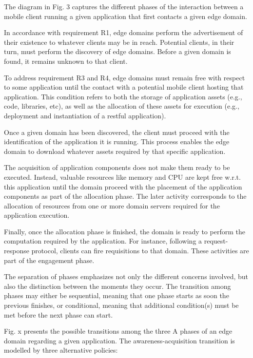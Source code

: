 The diagram in Fig. 3 captures the different phases of the interaction between a mobile client running a given application that first contacts a given edge domain. 
	
In accordance with requirement R1, edge domains perform the advertisement of their existence to whatever clients may be in reach. Potential clients, in their turn, must perform the discovery of edge domains. Before a given domain is found, it remains unknown to that client.

To address requirement R3 and R4, edge domains must remain free with respect to some application until the contact with a potential mobile client hosting that application. This condition refers to both the storage of application assets (e.g., code, libraries, etc), as well as the allocation of these assets for execution (e.g., deployment and instantiation of a restful application). 

Once a given domain has been discovered, the client must proceed with the identification of the application it is running. This process enables the edge domain to download whatever assets required by that specific application.  

The acquisition of application components does not make them ready to be executed. Instead, valuable resources like memory and CPU are kept free w.r.t. this application until the domain proceed with the placement of the application components as part of the allocation phase. The later activity corresponds to the allocation of resources from one or more domain servers required for the application execution. 	

Finally, once the allocation phase is finished, the domain is ready to perform the computation required by the application. For instance, following a request-response protocol, clients can fire requisitions to that domain. These activities are part of the engagement phase.

The separation of phases emphasizes not only the different concerns involved, but also the distinction between the moments they occur. The transition among phases may either be sequential, meaning that one phase starts as soon the previous finishes, or conditional, meaning that additional condition(s) must be met before the next phase can start. 	

Fig. x presents the possible transitions among the three A phases of an edge domain regarding a given application. The awareness-acquisition transition is modelled by three alternative policies: 

